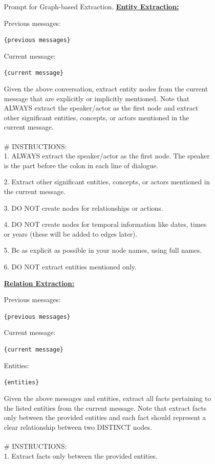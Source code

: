 


\begin{figure}[h]
\centering
\setlength{\abovecaptionskip}{0cm}
\begin{AIbox}{Prompt for Graph-based Extraction.}
\underline{\bf Entity Extraction:} 
{
\begin{tcolorbox}[colback=gray!10, colframe=gray!10, boxrule=0pt, sharp corners, left=0pt, right=0pt]
Previous messages:

\texttt{\{previous messages\}}

Current message: 

\texttt{\{current message\}}

Given the above conversation, extract entity nodes from the current message that are explicitly or implicitly mentioned. Note that ALWAYS extract the speaker/actor as the first node and extract other significant entities, concepts, or actors mentioned in the current message.\\
\\
\# INSTRUCTIONS:\\
1. ALWAYS extract the speaker/actor as the first node. The speaker is the part before the colon in each line of dialogue.

2. Extract other significant entities, concepts, or actors mentioned in the current message.

3. DO NOT create nodes for relationships or actions.

4. DO NOT create nodes for temporal information like dates, times or years (these will be added to edges later).

5. Be as explicit as possible in your node names, using full names.

6. DO NOT extract entities mentioned only.
\end{tcolorbox}
}
\underline{\bf Relation Extraction:} 
{
\begin{tcolorbox}[colback=gray!10, colframe=gray!20, boxrule=0pt, left=0pt, sharp corners, right=0pt]
Previous messages:

\texttt{\{previous messages\}}

Current message: 

\texttt{\{current message\}}

Entities:

\texttt{\{entities\}}

Given the above messages and entities, extract all facts pertaining to the listed entities from the current message. Note that extract facts only between the provided entities and each fact should represent a clear relationship between two DISTINCT nodes.\\
\\
\# INSTRUCTIONS:\\
1. Extract facts only between the provided entities.


\end{tcolorbox}}
\end{AIbox}
\end{figure}
